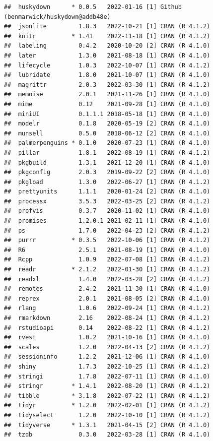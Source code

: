\documentclass[print]{nuthesis}
\begin{document}
\begin{verbatim}
##  huskydown      * 0.0.5   2022-01-16 [1] Github (benmarwick/huskydown@addb48e)
##  jsonlite         1.8.3   2022-10-21 [1] CRAN (R 4.1.2)
##  knitr          * 1.41    2022-11-18 [1] CRAN (R 4.1.2)
##  labeling         0.4.2   2020-10-20 [2] CRAN (R 4.1.0)
##  later            1.3.0   2021-08-18 [1] CRAN (R 4.1.0)
##  lifecycle        1.0.3   2022-10-07 [1] CRAN (R 4.1.2)
##  lubridate        1.8.0   2021-10-07 [1] CRAN (R 4.1.0)
##  magrittr         2.0.3   2022-03-30 [1] CRAN (R 4.1.2)
##  memoise          2.0.1   2021-11-26 [1] CRAN (R 4.1.0)
##  mime             0.12    2021-09-28 [1] CRAN (R 4.1.0)
##  miniUI           0.1.1.1 2018-05-18 [1] CRAN (R 4.1.0)
##  modelr           0.1.8   2020-05-19 [2] CRAN (R 4.1.0)
##  munsell          0.5.0   2018-06-12 [2] CRAN (R 4.1.0)
##  palmerpenguins * 0.1.0   2020-07-23 [1] CRAN (R 4.1.0)
##  pillar           1.8.1   2022-08-19 [1] CRAN (R 4.1.2)
##  pkgbuild         1.3.1   2021-12-20 [1] CRAN (R 4.1.0)
##  pkgconfig        2.0.3   2019-09-22 [2] CRAN (R 4.1.0)
##  pkgload          1.3.0   2022-06-27 [1] CRAN (R 4.1.2)
##  prettyunits      1.1.1   2020-01-24 [2] CRAN (R 4.1.0)
##  processx         3.5.3   2022-03-25 [2] CRAN (R 4.1.2)
##  profvis          0.3.7   2020-11-02 [1] CRAN (R 4.1.0)
##  promises         1.2.0.1 2021-02-11 [1] CRAN (R 4.1.0)
##  ps               1.7.0   2022-04-23 [2] CRAN (R 4.1.2)
##  purrr          * 0.3.5   2022-10-06 [1] CRAN (R 4.1.2)
##  R6               2.5.1   2021-08-19 [1] CRAN (R 4.1.0)
##  Rcpp             1.0.9   2022-07-08 [1] CRAN (R 4.1.2)
##  readr          * 2.1.2   2022-01-30 [1] CRAN (R 4.1.2)
##  readxl           1.4.0   2022-03-28 [2] CRAN (R 4.1.2)
##  remotes          2.4.2   2021-11-30 [1] CRAN (R 4.1.0)
##  reprex           2.0.1   2021-08-05 [2] CRAN (R 4.1.0)
##  rlang            1.0.6   2022-09-24 [1] CRAN (R 4.1.2)
##  rmarkdown        2.16    2022-08-24 [1] CRAN (R 4.1.2)
##  rstudioapi       0.14    2022-08-22 [1] CRAN (R 4.1.2)
##  rvest            1.0.2   2021-10-16 [1] CRAN (R 4.1.0)
##  scales           1.2.0   2022-04-13 [2] CRAN (R 4.1.2)
##  sessioninfo      1.2.2   2021-12-06 [1] CRAN (R 4.1.0)
##  shiny            1.7.3   2022-10-25 [1] CRAN (R 4.1.2)
##  stringi          1.7.8   2022-07-11 [1] CRAN (R 4.1.0)
##  stringr        * 1.4.1   2022-08-20 [1] CRAN (R 4.1.2)
##  tibble         * 3.1.8   2022-07-22 [1] CRAN (R 4.1.2)
##  tidyr          * 1.2.0   2022-02-01 [1] CRAN (R 4.1.2)
##  tidyselect       1.2.0   2022-10-10 [1] CRAN (R 4.1.2)
##  tidyverse      * 1.3.1   2021-04-15 [2] CRAN (R 4.1.0)
##  tzdb             0.3.0   2022-03-28 [1] CRAN (R 4.1.0)

\end{verbatim}
\end{document}
